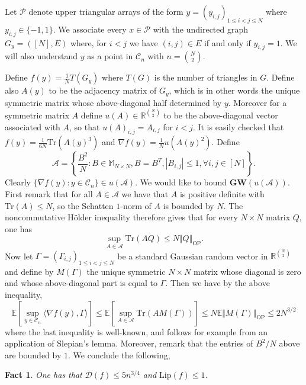 \documentclass[12pt]{article}
\def \RR {\mathbb R}
\def \EE {\mathbb E}
\def \Lip {\mathrm {Lip}}
\def \tr {\mathrm{Tr}}
\def \DC {\mathcal{C}_n}
\def \MW {\mathbf{GW}}
\def \Comp { \mathcal{D} }
\newtheorem{fact}[theorem]{Fact}
\theoremstyle{definition}
\theoremstyle{remark}
\begin{document}
Let $\mathcal{P}$ denote upper triangular arrays of the form $y = (y_{i,j})_{1 \leq i<j \leq N}$ where $y_{i,j} \in \{-1,1\}$. We associate every $x \in \mathcal{P}$ with the undirected graph $G_y=([N], E)$ where, for $i < j$ we have $(i,j) \in E$ if and only if $y_{i,j} = 1$. We will also understand $y$ as a point in $\DC$ with $n= {N \choose 2}$.

Define $f(y) = \frac{1}{N} T(G_y)$ where $T(G)$ is the number of triangles in $G$. Define also $A(y)$ to be the adjacency matrix of $G_y$, which is in other words the unique symmetric matrix whose above-diagonal half determined by $y$. Moreover for a symmetric matrix $A$ define $u(A) \in \RR^{N \choose 2}$ to be the above-diagonal vector associated with $A$, so that $u(A)_{i,j} = A_{i,j}$ for $i<j$. It is easily checked that $f(y) = \frac{1}{6 N} \tr(A(y)^3)$ and $\nabla f(y) = \frac{1}{N} u(A(y)^2)$. Define
$$
\mathcal{A} = \left \{ \frac{B^2}{N}: B \in \mathbb{M}_{N \times N}, B=B^T, |B_{i,j}| \leq 1, \forall i,j \in [N]  \right \}.
$$
Clearly $\{ \nabla f(y): y \in \DC \} \in u(\mathcal{A})$. We would like to bound $\MW(u(\mathcal{A}))$. First remark that for all $A \in \mathcal{A}$ we have that $A$ is positive definite with $\tr(A) \leq N$, so the Schatten $1$-norm of $A$ is bounded by $N$. The noncommutative H\"older inequality therefore gives that for every $N \times N$ matrix $Q$, one has
$$
\sup_{A \in \mathcal{A}} \tr(AQ) \leq N \Vert Q \Vert_{\mathrm{OP}}.
$$
Now let $\Gamma = (\Gamma_{i,j})_{1 \leq i < j \leq N}$ be a standard Gaussian random vector in $\RR^{{N \choose 2}}$ and define by $M(\Gamma)$ the unique symmetric $N \times N$ matrix whose diagonal is zero and whose above-diagonal part is equal to $\Gamma$. Then we have by the above inequality,
$$
\EE \left [\sup_{y \in \DC} \langle \nabla f(y), \Gamma \rangle \right ] \leq \EE \left [\sup_{A \in \mathcal{A}} \tr(A M(\Gamma)) \right ] \leq N \EE \Vert M(\Gamma) \Vert_{\mathrm{OP}} \leq 2 N^{3/2}
$$
where the last inequality is well-known, and follows for example from an application of Slepian's lemma. Moreover, remark that the entries of $B^2/N$ above are bounded by $1$. We conclude the following,
\begin{fact}
One has that $\Comp(f) \leq 5 n^{3/4}$ and $\Lip(f) \leq 1$.
\end{fact}
\end{document}
